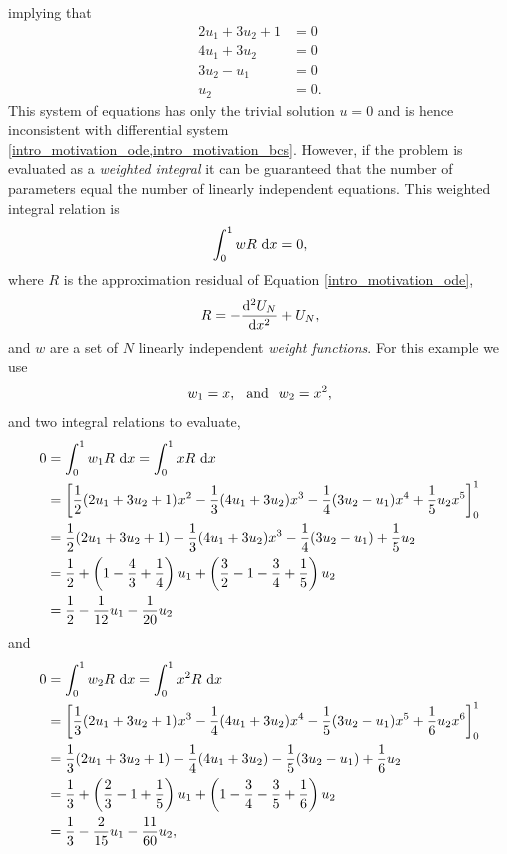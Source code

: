 implying that
\begin{align*}
  2u_1 + 3u_2 + 1 &= 0 \\
  4u_1 + 3u_2 &= 0 \\
  3u_2 - u_1 &= 0 \\
  u_2 &= 0.
\end{align*}
This system of equations has only the trivial solution $u=0$ and is hence inconsistent with differential system \cref{intro_motivation_ode,intro_motivation_bcs}.
However, if the problem is evaluated as a \emph{weighted integral} it can be guaranteed that the number of parameters equal the number of linearly independent equations.
This weighted integral relation is
$$\int_0^1 w R \d{x} = 0,$$
where $R$ is the approximation residual of Equation \cref{intro_motivation_ode},
$$R = - \totder[2]{U_N}{x} + U_N,$$
and $w$ are a set of $N$ linearly independent \emph{weight functions}.  For this example we use
$$w_1 = x, \hspace{2.5mm} \text{and} \hspace{2.5mm} w_2 = x^2,$$
and two integral relations to evaluate,
{\scriptsize
\begin{align*}
  0 &= \int_0^1 w_1 R \d{x} = \int_0^1 x R \d{x} \\
    &= \left[ \frac{1}{2}(2u_1 + 3u_2 + 1)x^2 - \frac{1}{3}(4u_1 + 3u_2)x^3 - \frac{1}{4}(3u_2 - u_1)x^4 + \frac{1}{5}u_2x^5 \right]_0^1 \\
    &= \frac{1}{2}(2u_1 + 3u_2 + 1) - \frac{1}{3}(4u_1 + 3u_2)x^3 - \frac{1}{4}(3u_2 - u_1) + \frac{1}{5}u_2 \\
    &= \frac{1}{2} + \left( 1 - \frac{4}{3} + \frac{1}{4} \right) u_1 + \left( \frac{3}{2} - 1 - \frac{3}{4} + \frac{1}{5} \right) u_2 \\
    &= \frac{1}{2} - \frac{1}{12} u_1 - \frac{1}{20} u_2
\end{align*}}
and
{\scriptsize
\begin{align*}
  0 &= \int_0^1 w_2 R \d{x} = \int_0^1 x^2 R \d{x} \\
    &= \left[ \frac{1}{3}(2u_1 + 3u_2 + 1)x^3 - \frac{1}{4}(4u_1 + 3u_2)x^4 - \frac{1}{5}(3u_2 - u_1)x^5 + \frac{1}{6}u_2x^6 \right]_0^1 \\
    &= \frac{1}{3}(2u_1 + 3u_2 + 1) - \frac{1}{4}(4u_1 + 3u_2) - \frac{1}{5}(3u_2 - u_1) + \frac{1}{6}u_2 \\
    &= \frac{1}{3} + \left( \frac{2}{3} - 1 + \frac{1}{5} \right) u_1 + \left( 1 - \frac{3}{4} - \frac{3}{5} + \frac{1}{6} \right) u_2 \\
    &= \frac{1}{3} - \frac{2}{15} u_1 - \frac{11}{60} u_2,
\end{align*}}
